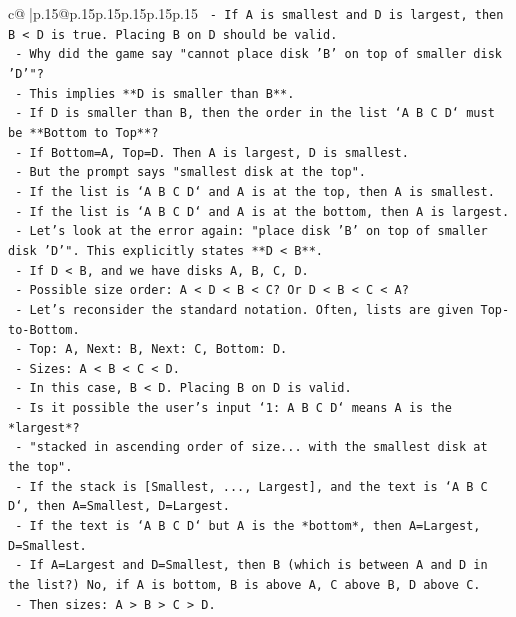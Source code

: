 \documentclass{article}
\begin{document}
{\begin{supertabular}{c@{$\;$}|p{.15\linewidth}@{}p{.15\linewidth}p{.15\linewidth}p{.15\linewidth}p{.15\linewidth}p{.15\linewidth}}
{{{\texttt{  {-} If A is smallest and D is largest, then B < D is true. Placing B on D should be valid.} \\
\texttt{  {-} Why did the game say "cannot place disk 'B' on top of smaller disk 'D'"?} \\
\texttt{  {-} This implies **D is smaller than B**.} \\
\texttt{  {-} If D is smaller than B, then the order in the list `A B C D` must be **Bottom to Top**?} \\
\texttt{    {-} If Bottom=A, Top=D. Then A is largest, D is smallest.} \\
\texttt{    {-} But the prompt says "smallest disk at the top".} \\
\texttt{    {-} If the list is `A B C D` and A is at the top, then A is smallest.} \\
\texttt{    {-} If the list is `A B C D` and A is at the bottom, then A is largest.} \\
\texttt{    {-} Let's look at the error again: "place disk 'B' on top of smaller disk 'D'". This explicitly states **D < B**.} \\
\texttt{    {-} If D < B, and we have disks A, B, C, D.} \\
\texttt{    {-} Possible size order: A < D < B < C? Or D < B < C < A?} \\
\texttt{    {-} Let's reconsider the standard notation. Often, lists are given Top{-}to{-}Bottom.} \\
\texttt{      {-} Top: A, Next: B, Next: C, Bottom: D.} \\
\texttt{      {-} Sizes: A < B < C < D.} \\
\texttt{      {-} In this case, B < D. Placing B on D is valid.} \\
\texttt{    {-} Is it possible the user's input `1: A B C D` means A is the *largest*?} \\
\texttt{      {-} "stacked in ascending order of size... with the smallest disk at the top".} \\
\texttt{      {-} If the stack is {[}Smallest, ..., Largest{]}, and the text is `A B C D`, then A=Smallest, D=Largest.} \\
\texttt{      {-} If the text is `A B C D` but A is the *bottom*, then A=Largest, D=Smallest.} \\
\texttt{      {-} If A=Largest and D=Smallest, then B (which is between A and D in the list?) No, if A is bottom, B is above A, C above B, D above C.} \\
\texttt{      {-} Then sizes: A > B > C > D.} \\
}}}
\end{supertabular}}
\end{document}
